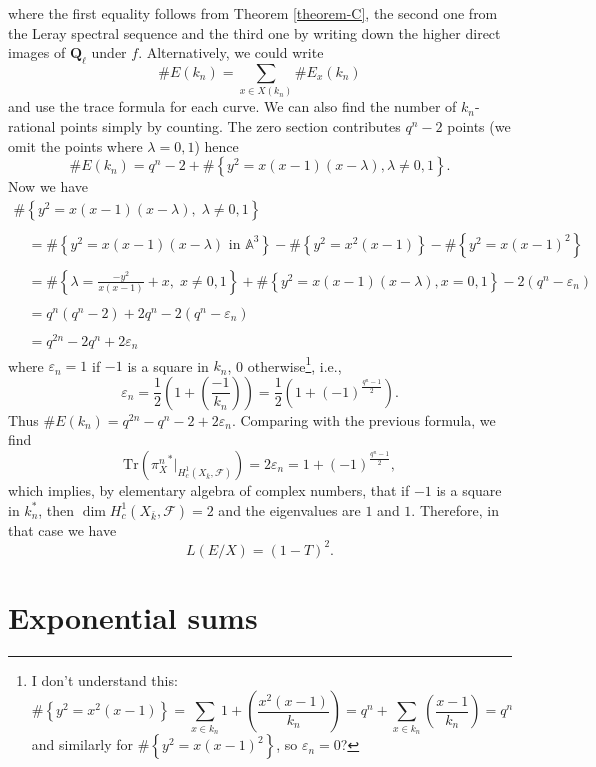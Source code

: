 where the first equality follows from
Theorem \ref{theorem-C},
the second one from
the Leray spectral sequence and the third one by writing down the higher direct
images of $\mathbf{Q}_\ell$ under $f$. Alternatively, we could write
$$
\#E(k_n) = \sum_{x \in X(k_n)} \#E_x(k_n)
$$
and use the trace formula for each curve. We can also find the number of
$k_n$-rational points simply by counting. The zero section contributes $q^n -2$
points (we omit the points where $\lambda = 0, 1$) hence
$$
\# E(k_n) =
q^n-2 + \#\left\{y^2 = x(x-1)(x-\lambda), \lambda\neq 0, 1\right\}.
$$
Now we have
$$
\begin{matrix}
\#\left\{y^2 = x(x-1)(x-\lambda), \; \lambda\neq 0, 1\right\}\\
\\
\quad = \#\left\{y^2 = x(x-1)(x-\lambda)\text{ in }\mathbb A^3\right\}
-\#\left\{y^2 = x^2(x-1)\right\}-\#\left\{y^2 = x(x-1)^2\right\}\\
\\
\quad = \#\left\{\lambda=\frac{-y^2}{x(x-1)}+x, \; x\neq 0, 1\right\} +
\#\left\{y^2 = x(x-1)(x-\lambda), x=0, 1\right\}-2(q^n-\varepsilon_n) \\
\\
\quad = q^n(q^n-2)+2q^n-2(q^n-\varepsilon_n)\\
\\
\quad = q^{2n}-2q^n+2\varepsilon_n
\end{matrix}
$$
where $\varepsilon_n = 1$ if $-1$ is a square in $k_n$, 0 otherwise\footnote{I
don't understand this:
$$
\#\left\{y^2 = x^2(x-1)\right\} = \sum_{x \in k_n}
1+\left(\frac{x^2(x-1)}{k_n}\right) = q^n+\sum_{x \in k_n}
\left(\frac{x-1}{k_n}\right) = q^n
$$
and similarly for $\#\left\{y^2 = x(x-1)^2\right\}$, so $\varepsilon_n = 0$?},
i.e.,
$$
\varepsilon_n = \frac{1}{2}\left(1+\left(\frac{-1}{k_n}\right)\right) =
\frac{1}{2}\left(1+(-1)^{\frac{q^n-1}{2}}\right).
$$
Thus $ \# E(k_n) = q^{2n}-q^n-2+ 2\varepsilon_n$. Comparing with the previous
formula, we find
$$
\text{Tr}\left({\pi_X^n}^*\big|_{H_c^1(X_{\bar k}, \mathcal{F})}\right) = 2
\varepsilon_n = 1+(-1)^{\frac{q^n-1}{2}},
$$
which implies, by elementary algebra of complex numbers, that if $-1$ is a
square in $k_n^*$, then $\dim H_c^1(X_{\bar k}, \mathcal{F}) = 2$ and the
eigenvalues are $1$ and $1$. Therefore, in that case we have
$$
L(E/X) = (1-T)^2.
$$




\section{Exponential sums}
\label{section-exponential-sums}

